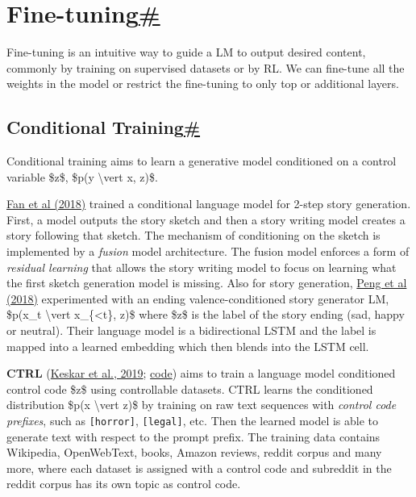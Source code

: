 \section{\texorpdfstring{Fine-tuning\hyperref[fine-tuning]{\#}}{Fine-tuning\#}}\label{fine-tuning}

Fine-tuning is an intuitive way to guide a LM to output desired content, commonly by training on supervised datasets or by RL. We can fine-tune all the weights in the model or restrict the fine-tuning to only top or additional layers.

\subsection{\texorpdfstring{Conditional Training\hyperref[conditional-training]{\#}}{Conditional Training\#}}\label{conditional-training}

Conditional training aims to learn a generative model conditioned on a control variable \$z\$, \$p(y \textbackslash vert x, z)\$.

\href{https://arxiv.org/abs/1805.04833}{Fan et al (2018)} trained a conditional language model for 2-step story generation. First, a model outputs the story sketch and then a story writing model creates a story following that sketch. The mechanism of conditioning on the sketch is implemented by a \emph{fusion} model architecture. The fusion model enforces a form of \emph{residual learning} that allows the story writing model to focus on learning what the first sketch generation model is missing. Also for story generation, \href{https://www.aclweb.org/anthology/W18-1505/}{Peng et al (2018)} experimented with an ending valence-conditioned story generator LM, \$p(x\_t \textbackslash vert x\_\{\textless t\}, z)\$ where \$z\$ is the label of the story ending (sad, happy or neutral). Their language model is a bidirectional LSTM and the label is mapped into a learned embedding which then blends into the LSTM cell.

\label{ctrl}{}\textbf{CTRL} (\href{https://arxiv.org/abs/1909.05858}{Keskar et al., 2019}; \href{https://github.com/salesforce/ctrl}{code}) aims to train a language model conditioned control code \$z\$ using controllable datasets. CTRL learns the conditioned distribution \$p(x \textbackslash vert z)\$ by training on raw text sequences with \emph{control code prefixes}, such as \texttt{{[}horror{]}}, \texttt{{[}legal{]}}, etc. Then the learned model is able to generate text with respect to the prompt prefix. The training data contains Wikipedia, OpenWebText, books, Amazon reviews, reddit corpus and many more, where each dataset is assigned with a control code and subreddit in the reddit corpus has its own topic as control code.

